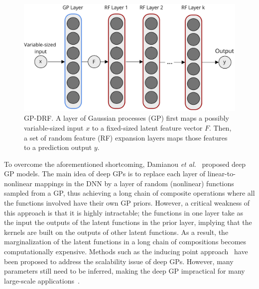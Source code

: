 \documentclass[conference]{IEEEtran}
\begin{document}
\begin{figure}
\begin{center}
\includegraphics[trim = 0mm 0mm 0mm 0mm, clip, scale=0.42]{figs/gp_drf_2.pdf} 
\end{center}
\vspace{-0.8em}
\caption{GP-DRF. A layer of Gaussian processes (GP) first maps a possibly variable-sized input $x$ to a fixed-sized latent feature vector $F$. Then, a set of random feature (RF) expansion layers maps those features to a prediction output $y$.}
\vspace{-0.5em}
\label{fig:overview}
\end{figure}

To overcome the aforementioned shortcoming, Damianou {\em et al.}~\cite{deepgp13} proposed deep GP models. The main idea of deep GPs is to replace each layer of linear-to-nonlinear mappings in the DNN by a layer of random (nonlinear) functions sampled from a GP, thus achieving a long chain of composite operations where all the functions involved have their own GP priors. However, a critical weakness of this approach is that it is highly intractable; the functions in one layer take as the input the outputs of the latent functions in the prior layer, implying that the kernels are built on the outputs of other latent functions. As a result, the marginalization of the latent functions in a long chain of compositions becomes computationally expensive. Methods such as the inducing point approach~\cite{quinonero2005unifying} have been proposed to address the scalability issue of deep GPs. However, many parameters still need to be inferred, making the deep GP impractical for many large-scale applications~\cite{rfdnn17}.
\end{document}
